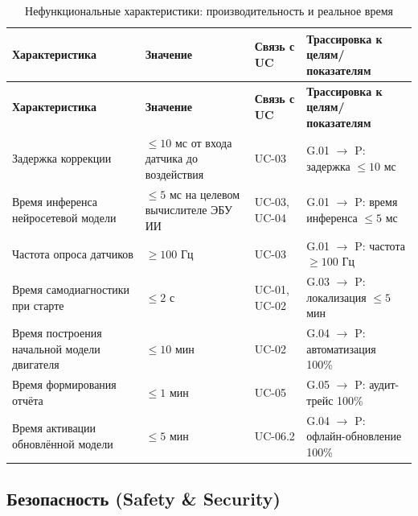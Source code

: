 \documentclass[14pt, a4paper]{extarticle}
\begin{document}
				\begin{xltabular}{\textwidth}{|L|L|L|L|}
					\caption{Нефункциональные характеристики: производительность и реальное время}\label{tab:nfr-performance}\\
					\hline
					\textbf{Характеристика} & \textbf{Значение} & \textbf{Связь с UC} & \textbf{Трассировка к целям/показателям} \\
					\hline
					\endfirsthead
					\hline
					\textbf{Характеристика} & \textbf{Значение} & \textbf{Связь с UC} & \textbf{Трассировка к целям/показателям} \\
					\hline
					\endhead
					\hline
					\endfoot
					\hline
					\endlastfoot
					Задержка коррекции & \(\leq 10\) мс от входа датчика до воздействия & UC-03 & G.01 \(\to\) P: задержка \(\leq 10\) мс \\
					\hline
					Время инференса нейросетевой модели & \(\leq 5\) мс на целевом вычислителе ЭБУ ИИ & UC-03, UC-04 & G.01 \(\to\) P: время инференса \(\leq 5\) мс \\
					\hline
					Частота опроса датчиков & \(\geq 100\) Гц & UC-03 & G.01 \(\to\) P: частота \(\geq 100\) Гц \\
					\hline
					Время самодиагностики при старте & \(\leq 2\) с & UC-01, UC-02 & G.03 \(\to\) P: локализация \(\leq 5\) мин \\
					\hline
					Время построения начальной модели двигателя & \(\leq 10\) мин & UC-02 & G.04 \(\to\) P: автоматизация 100\% \\
					\hline
					Время формирования отчёта & \(\leq 1\) мин & UC-05 & G.05 \(\to\) P: аудит-трейс 100\% \\
					\hline
					Время активации обновлённой модели & \(\leq 5\) мин & UC-06.2 & G.04 \(\to\) P: офлайн-обновление 100\% \\
					\hline
				\end{xltabular}
				
				\subsection{Безопасность (Safety \& Security)}
				
\end{document}
